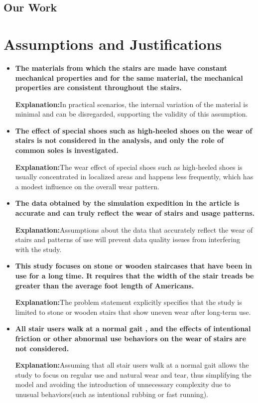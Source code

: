 \documentclass{mcmthesis}
\begin{document}
\subsection{Our Work}
\section{Assumptions and Justifications}
\begin{itemize}
\item \textbf{The materials from which the stairs are made have constant mechanical properties and for the same material, the mechanical properties are consistent throughout the stairs.}

\textbf{Explanation:}In practical scenarios, the internal variation of the material is minimal and can be disregarded, supporting the validity of this assumption.

\item \textbf{The effect of special shoes such as high-heeled shoes on the wear of stairs is not considered in the analysis, and only the role of common soles is investigated.}

\textbf{Explanation:}The wear effect of special shoes such as high-heeled shoes is usually concentrated in localized areas and happens less frequently, which has a modest influence on the overall wear pattern.

\item \textbf{The data obtained by the simulation expedition in the article is accurate and can truly reflect the wear of stairs and usage patterns.}

\textbf{Explanation:}Assumptions about the data that accurately reflect the wear of stairs and patterns of use will prevent data quality issues from interfering with the study.

\item \textbf{This study focuses on stone or wooden staircases that have been in use for a long time. It requires that the width of the stair treads be greater than the average foot length of Americans.}

\textbf{Explanation:}The problem statement explicitly specifies that the study is limited to stone or wooden stairs that show uneven wear after long-term use.

\item \textbf{All stair users walk at a normal gait , and the effects of intentional friction or other abnormal use behaviors on the wear of stairs are not considered.}

\textbf{Explanation:}Assuming that all stair users walk at a normal gait allows the study to focus on regular use and natural wear and tear, thus simplifying the model and avoiding the introduction of unnecessary complexity due to unusual behaviors(such as intentional rubbing or fast running).

\end{itemize}
\end{document}
